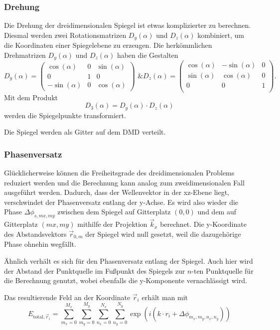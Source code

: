 \subsubsection{Drehung}
Die Drehung der dreidimensionalen Spiegel ist etwas komplizierter zu berechnen. Diesmal werden zwei Rotationsmatrizen $D_y(\alpha)$ und $D_z(\alpha)$ kombiniert, um die Koordinaten einer Spiegelebene zu erzeugen. Die herkömmlichen Drehmatrizen $D_y(\alpha)$ und $D_z(\alpha)$ haben die Gestalten
\begin{equation}
    D_y(\alpha)=\left(\begin{matrix}
        \cos(\alpha) & 0 & \sin(\alpha) \\
        0 & 1 & 0 \\ 
        -\sin(\alpha) & 0 & \cos(\alpha)
    \end{matrix}\right)\text{ \& }
    D_z(\alpha)=\left(\begin{matrix}
        \cos(\alpha) & -\sin(\alpha) & 0 \\
        \sin(\alpha) & \cos(\alpha) & 0 \\
        0 & 0 & 1 \\ 
    \end{matrix}\right).
\end{equation}
Mit dem Produkt
\begin{equation}
    D_3(\alpha)=D_y(\alpha)\cdot D_z(\alpha)
\end{equation}
werden die Spiegelpunkte transformiert.

Die Spiegel werden als Gitter auf dem DMD verteilt.
\subsubsection{Phasenversatz}
Glücklicherweise können die Freiheitsgrade des dreidimensionalen Problems reduziert werden und die Berechnung kann analog zum zweidimensionalen Fall ausgeführt werden. Dadurch, dass der Wellenvektor in der xz-Ebene liegt, verschwindet der Phasenversatz entlang der y-Achse. Es wird also wieder die Phase $\Delta\phi_{s, mx, my}$ zwischen dem Spiegel auf Gitterplatz $(0, 0)$ und dem auf Gitterplatz $(mx, my)$ mithilfe der Projektion $\vec{k}_x$ berechnet. Die y-Koordinate des Abstandsvektors $\vec{r}_{0, m}$ der Spiegel wird null gesetzt, weil die dazugehörige Phase ohnehin wegfällt.

Ähnlich verhält es sich für den Phasenversatz entlang der Spiegel. Auch hier wird der Abstand der Punktquelle im Fußpunkt des Spiegels zur $n$-ten Punktquelle für die Berechnung genutzt, wobei ebenfalls die y-Komponente vernachlässigt wird.

Das resultierende Feld an der Koordinate $\vec{r}_i$ erhält man mit
\begin{equation}
    E_{\text{total}, \vec{r}_i}=\sum_{m_x=0}^{M_x}\sum_{m_y=0}^{M_y}\sum_{n_x=0}^{N_x}\sum_{n_y=0}^{N_y}\exp(i(k\cdot r_i+\Delta\phi_{m_x, m_y, n_x, n_y}))
\end{equation}